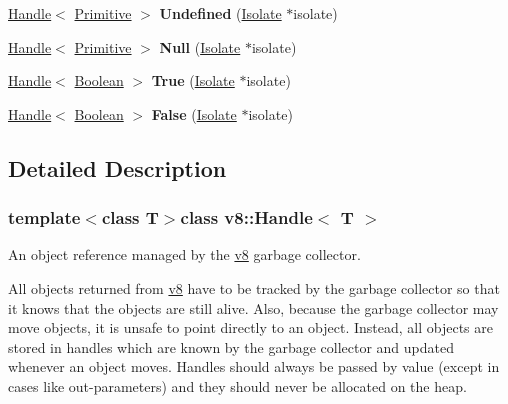 \begin{DoxyCompactItemize}
\item 
\hypertarget{classv8_1_1_handle_a54e0b3d94c2292e9f7d4fc1618ecfdd6}{}\hyperlink{classv8_1_1_handle}{Handle}$<$ \hyperlink{classv8_1_1_primitive}{Primitive} $>$ {\bfseries Undefined} (\hyperlink{classv8_1_1_isolate}{Isolate} $\ast$isolate)\label{classv8_1_1_handle_a54e0b3d94c2292e9f7d4fc1618ecfdd6}

\item 
\hypertarget{classv8_1_1_handle_a495be557de6f0ea3848a2e8fc6505577}{}\hyperlink{classv8_1_1_handle}{Handle}$<$ \hyperlink{classv8_1_1_primitive}{Primitive} $>$ {\bfseries Null} (\hyperlink{classv8_1_1_isolate}{Isolate} $\ast$isolate)\label{classv8_1_1_handle_a495be557de6f0ea3848a2e8fc6505577}

\item 
\hypertarget{classv8_1_1_handle_a29e5558f47ee7c44b54dc3c20eaceb32}{}\hyperlink{classv8_1_1_handle}{Handle}$<$ \hyperlink{classv8_1_1_boolean}{Boolean} $>$ {\bfseries True} (\hyperlink{classv8_1_1_isolate}{Isolate} $\ast$isolate)\label{classv8_1_1_handle_a29e5558f47ee7c44b54dc3c20eaceb32}

\item 
\hypertarget{classv8_1_1_handle_af328581ad265dc321eb55a587708eedc}{}\hyperlink{classv8_1_1_handle}{Handle}$<$ \hyperlink{classv8_1_1_boolean}{Boolean} $>$ {\bfseries False} (\hyperlink{classv8_1_1_isolate}{Isolate} $\ast$isolate)\label{classv8_1_1_handle_af328581ad265dc321eb55a587708eedc}

\end{DoxyCompactItemize}


\subsection{Detailed Description}
\subsubsection*{template$<$class T$>$class v8\+::\+Handle$<$ T $>$}

An object reference managed by the \hyperlink{namespacev8}{v8} garbage collector.

All objects returned from \hyperlink{namespacev8}{v8} have to be tracked by the garbage collector so that it knows that the objects are still alive. Also, because the garbage collector may move objects, it is unsafe to point directly to an object. Instead, all objects are stored in handles which are known by the garbage collector and updated whenever an object moves. Handles should always be passed by value (except in cases like out-\/parameters) and they should never be allocated on the heap.

